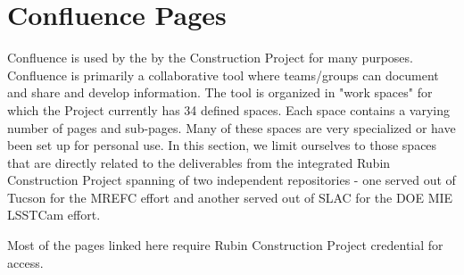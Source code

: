 \newpage
\section{Confluence Pages}

Confluence is used by the by the Construction Project for many purposes.  Confluence is primarily a collaborative tool where teams/groups can document and share and develop information. \citep{Confluence-cite} The tool is organized in "work spaces" for which the Project currently has 34 defined spaces. Each space contains a varying number of pages and sub-pages. Many of these spaces are very specialized or have been set up for personal use.  In this section, we limit ourselves to those spaces that are directly related to the deliverables from the integrated Rubin Construction Project spanning of two independent repositories - one served out of Tucson for the MREFC effort and another served out of SLAC for the DOE MIE LSSTCam effort.

Most of the pages linked here require Rubin Construction Project credential for access.

